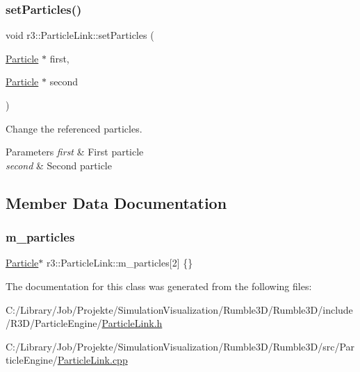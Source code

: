 \subsubsection{\texorpdfstring{set\+Particles()}{setParticles()}}
{\footnotesize\ttfamily void r3\+::\+Particle\+Link\+::set\+Particles (\begin{DoxyParamCaption}\item[{\mbox{\hyperlink{classr3_1_1_particle}{Particle}} $\ast$}]{first,  }\item[{\mbox{\hyperlink{classr3_1_1_particle}{Particle}} $\ast$}]{second }\end{DoxyParamCaption})}



Change the referenced particles. 


\begin{DoxyParams}{Parameters}
{\em first} & First particle \\
\hline
{\em second} & Second particle \\
\hline
\end{DoxyParams}


\subsection{Member Data Documentation}
\mbox{\label{classr3_1_1_particle_link_a2794d7fe45d905d9c11bb79be3d8e3c8}} 
\subsubsection{\texorpdfstring{m\+\_\+particles}{m\_particles}}
{\footnotesize\ttfamily \mbox{\hyperlink{classr3_1_1_particle}{Particle}}$\ast$ r3\+::\+Particle\+Link\+::m\+\_\+particles\mbox{[}2\mbox{]} \{\}\hspace{0.3cm}{\ttfamily [protected]}}



The documentation for this class was generated from the following files\+:\begin{DoxyCompactItemize}
\item 
C\+:/\+Library/\+Job/\+Projekte/\+Simulation\+Visualization/\+Rumble3\+D/\+Rumble3\+D/include/\+R3\+D/\+Particle\+Engine/\mbox{\hyperlink{_particle_link_8h}{Particle\+Link.\+h}}\item 
C\+:/\+Library/\+Job/\+Projekte/\+Simulation\+Visualization/\+Rumble3\+D/\+Rumble3\+D/src/\+Particle\+Engine/\mbox{\hyperlink{_particle_link_8cpp}{Particle\+Link.\+cpp}}\end{DoxyCompactItemize}
